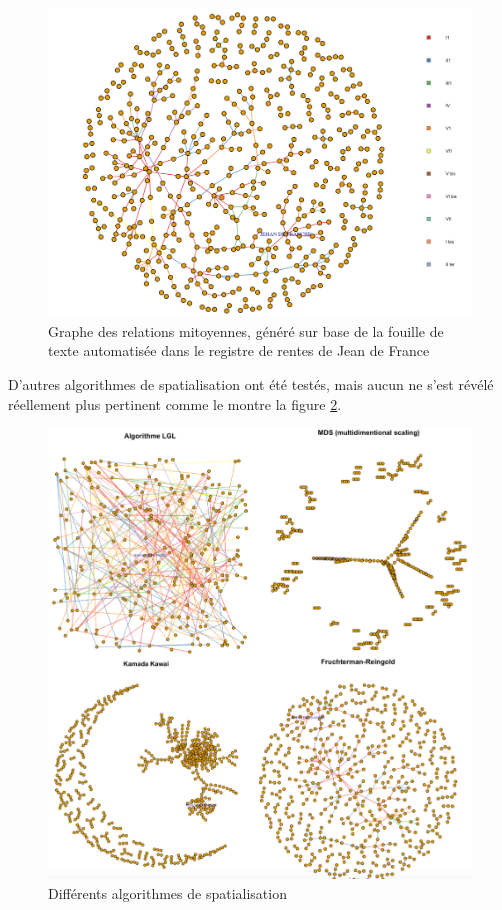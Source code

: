 \begin{figure}
    \centering
    \includegraphics[scale=0.45]{3.Results/Img/plot_igraph.png}
    \caption{Graphe des relations mitoyennes, généré sur base de la fouille de texte automatisée dans le registre de rentes de Jean de France }
    \label{fig:plot_igraph}
\end{figure}

D'autres algorithmes de spatialisation ont été testés, mais aucun ne s'est révélé réellement plus pertinent comme le montre la figure \ref{fig:layout}.

\begin{figure}
    \centering
    \includegraphics[scale=0.5]{3.Results/Img/layout.png}
    \caption{Différents algorithmes de spatialisation}
    \label{fig:layout}
\end{figure}
